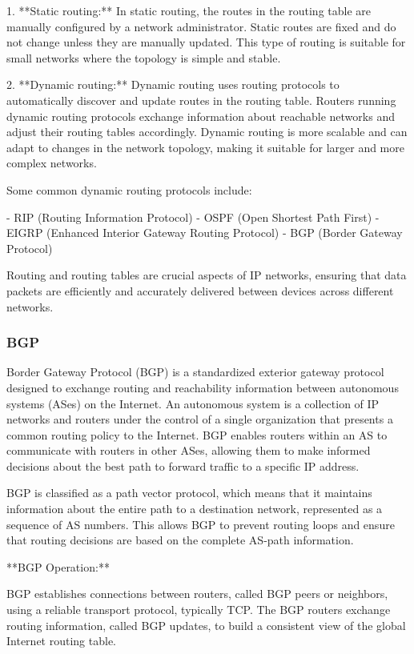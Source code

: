 \documentclass{article}
\begin{document}
1. **Static routing:** In static routing, the routes in the routing table are manually configured by a network administrator. Static routes are fixed and do not change unless they are manually updated. This type of routing is suitable for small networks where the topology is simple and stable.

2. **Dynamic routing:** Dynamic routing uses routing protocols to automatically discover and update routes in the routing table. Routers running dynamic routing protocols exchange information about reachable networks and adjust their routing tables accordingly. Dynamic routing is more scalable and can adapt to changes in the network topology, making it suitable for larger and more complex networks.

Some common dynamic routing protocols include:

- RIP (Routing Information Protocol)
- OSPF (Open Shortest Path First)
- EIGRP (Enhanced Interior Gateway Routing Protocol)
- BGP (Border Gateway Protocol)

Routing and routing tables are crucial aspects of IP networks, ensuring that data packets are efficiently and accurately delivered between devices across different networks.


\subsubsection{BGP}

Border Gateway Protocol (BGP) is a standardized exterior gateway protocol designed to exchange routing and reachability information between autonomous systems (ASes) on the Internet. An autonomous system is a collection of IP networks and routers under the control of a single organization that presents a common routing policy to the Internet. BGP enables routers within an AS to communicate with routers in other ASes, allowing them to make informed decisions about the best path to forward traffic to a specific IP address.

BGP is classified as a path vector protocol, which means that it maintains information about the entire path to a destination network, represented as a sequence of AS numbers. This allows BGP to prevent routing loops and ensure that routing decisions are based on the complete AS-path information.

**BGP Operation:**

BGP establishes connections between routers, called BGP peers or neighbors, using a reliable transport protocol, typically TCP. The BGP routers exchange routing information, called BGP updates, to build a consistent view of the global Internet routing table.
\end{document}
